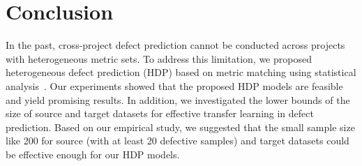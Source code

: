\section{Conclusion}
\label{sec:Conclusion}

In the past, cross-project defect prediction cannot be conducted across projects
with heterogeneous metric sets. To address
this limitation, we proposed heterogeneous defect prediction (HDP) based on
metric matching using statistical analysis~\cite{Massey51}. Our experiments
showed that the proposed HDP models are feasible and yield promising results. In addition, we investigated the lower bounds of the size of source and target datasets for effective transfer learning in defect prediction. Based on our empirical study, we suggested that the small sample size like 200 for source (with at least 20 defective samples) and target datasets could be effective enough for our HDP models.




